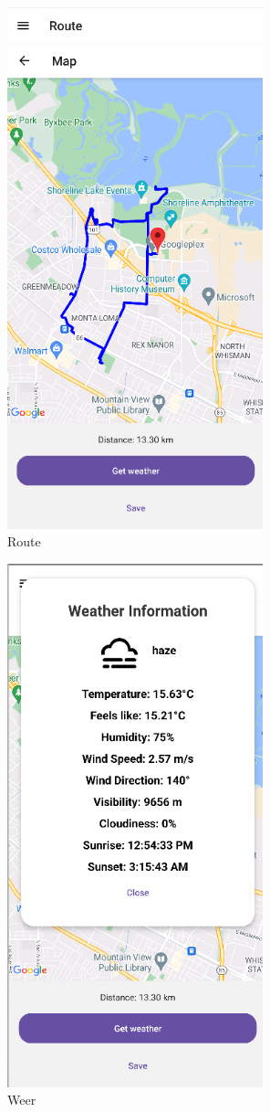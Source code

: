     \begin{figure}[htbp]
        \includegraphics[width=20em]{./graphics/route.png}
        \centering
        \caption{Route}
        \label{fig:route}
    \end{figure}

    \begin{figure}[htbp]
        \includegraphics[width=20em]{./graphics/weather.png}
        \centering
        \caption{Weer}
        \label{fig:weather}
    \end{figure}

